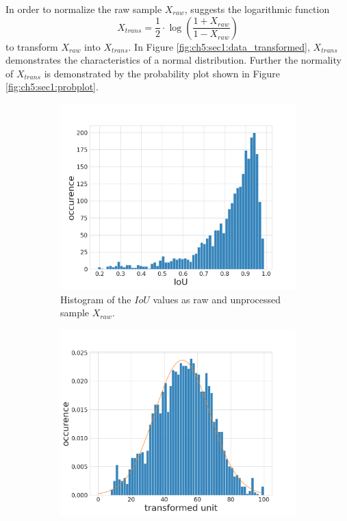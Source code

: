 In order to normalize the raw sample $ X_{raw} $, \cite{PS16-Statistics} suggests the logarithmic function
\begin{equation} \label{equ:trans_iou}
	X_{trans} = \frac{1}{2} \cdot \log \left( \frac{1 + X_{raw}}{1 - X_{raw}}\right) 
\end{equation}
to transform $ X_{raw} $ into $ X_{trans} $.
In Figure \ref{fig:ch5:sec1:data_transformed}, $ X_{trans} $ demonstrates the characteristics of a normal distribution.
Further the normality of $ X_{trans} $ is demonstrated by the probability plot shown in Figure \ref{fig:ch5:sec1:probplot}.

\begin{figure} [h]
	\centering
	\begin{subfigure}[t]{0.3\textwidth}
		\centering
		\includegraphics[width=\textwidth]{figures/chap51_iou_raw.png}
		\caption{
			Histogram of the $ IoU $ values as raw and unprocessed sample $ X_{raw} $.
		}\label{fig:ch5:sec1:data_raw}
	\end{subfigure}
	\hfill
	\begin{subfigure}[t]{0.3\textwidth}
		\centering
		\includegraphics[width=\textwidth]{figures/chap51_iou_trans.png}

\end{subfigure}
\end{figure}

